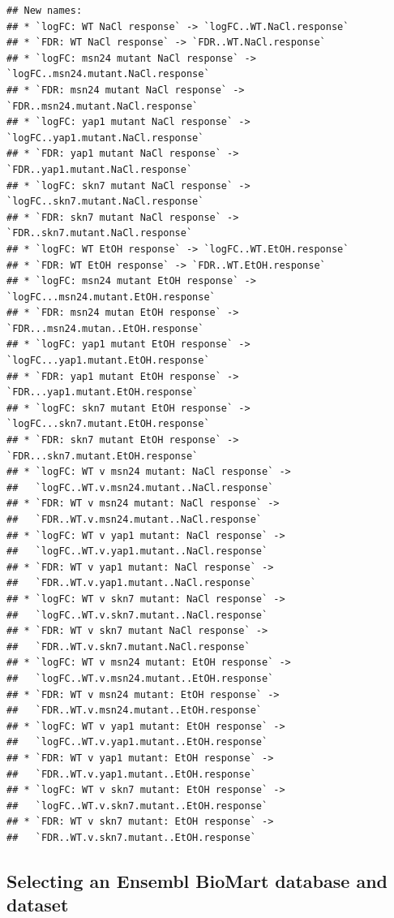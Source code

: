 \documentclass[
]{book}
\begin{document}
\begin{verbatim}
## New names:
## * `logFC: WT NaCl response` -> `logFC..WT.NaCl.response`
## * `FDR: WT NaCl response` -> `FDR..WT.NaCl.response`
## * `logFC: msn24 mutant NaCl response` -> `logFC..msn24.mutant.NaCl.response`
## * `FDR: msn24 mutant NaCl response` -> `FDR..msn24.mutant.NaCl.response`
## * `logFC: yap1 mutant NaCl response` -> `logFC..yap1.mutant.NaCl.response`
## * `FDR: yap1 mutant NaCl response` -> `FDR..yap1.mutant.NaCl.response`
## * `logFC: skn7 mutant NaCl response` -> `logFC..skn7.mutant.NaCl.response`
## * `FDR: skn7 mutant NaCl response` -> `FDR..skn7.mutant.NaCl.response`
## * `logFC: WT EtOH response` -> `logFC..WT.EtOH.response`
## * `FDR: WT EtOH response` -> `FDR..WT.EtOH.response`
## * `logFC: msn24 mutant EtOH response` -> `logFC...msn24.mutant.EtOH.response`
## * `FDR: msn24 mutan EtOH response` -> `FDR...msn24.mutan..EtOH.response`
## * `logFC: yap1 mutant EtOH response` -> `logFC...yap1.mutant.EtOH.response`
## * `FDR: yap1 mutant EtOH response` -> `FDR...yap1.mutant.EtOH.response`
## * `logFC: skn7 mutant EtOH response` -> `logFC...skn7.mutant.EtOH.response`
## * `FDR: skn7 mutant EtOH response` -> `FDR...skn7.mutant.EtOH.response`
## * `logFC: WT v msn24 mutant: NaCl response` ->
##   `logFC..WT.v.msn24.mutant..NaCl.response`
## * `FDR: WT v msn24 mutant: NaCl response` ->
##   `FDR..WT.v.msn24.mutant..NaCl.response`
## * `logFC: WT v yap1 mutant: NaCl response` ->
##   `logFC..WT.v.yap1.mutant..NaCl.response`
## * `FDR: WT v yap1 mutant: NaCl response` ->
##   `FDR..WT.v.yap1.mutant..NaCl.response`
## * `logFC: WT v skn7 mutant: NaCl response` ->
##   `logFC..WT.v.skn7.mutant..NaCl.response`
## * `FDR: WT v skn7 mutant NaCl response` ->
##   `FDR..WT.v.skn7.mutant.NaCl.response`
## * `logFC: WT v msn24 mutant: EtOH response` ->
##   `logFC..WT.v.msn24.mutant..EtOH.response`
## * `FDR: WT v msn24 mutant: EtOH response` ->
##   `FDR..WT.v.msn24.mutant..EtOH.response`
## * `logFC: WT v yap1 mutant: EtOH response` ->
##   `logFC..WT.v.yap1.mutant..EtOH.response`
## * `FDR: WT v yap1 mutant: EtOH response` ->
##   `FDR..WT.v.yap1.mutant..EtOH.response`
## * `logFC: WT v skn7 mutant: EtOH response` ->
##   `logFC..WT.v.skn7.mutant..EtOH.response`
## * `FDR: WT v skn7 mutant: EtOH response` ->
##   `FDR..WT.v.skn7.mutant..EtOH.response`
\end{verbatim}

\hypertarget{selecting-an-ensembl-biomart-database-and-dataset}{%
\subsection{Selecting an Ensembl BioMart database and dataset}\label{selecting-an-ensembl-biomart-database-and-dataset}}
\end{document}
